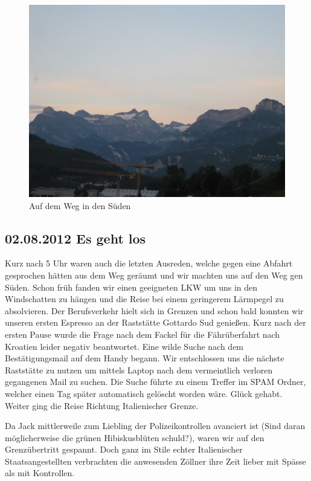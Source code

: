 \begin{figure}[hbt]
    \centering
    \includegraphics[width=\textwidth]{../Bilder/Sommer2012/1.jpg}
    \caption{Auf dem Weg in den Süden}
    \label{img:Sommer1}
\end{figure}

\subsection{02.08.2012 Es geht los}
Kurz nach 5 Uhr waren auch die letzten Ausreden, welche gegen eine Abfahrt gesprochen hätten aus dem Weg geräumt und wir machten uns auf den Weg gen Süden.
Schon früh fanden wir einen geeigneten LKW um uns in den Windschatten zu hängen und die Reise bei einem geringerem Lärmpegel zu absolvieren.
Der Berufsverkehr hielt sich in Grenzen und schon bald konnten wir unseren ersten Espresso an der Raststätte Gottardo Sud genießen.
Kurz nach der ersten Pause wurde die Frage nach dem Fackel für die Fährüberfahrt nach Kroatien leider negativ beantwortet.
Eine wilde Suche nach dem Bestätigungsmail auf dem Handy begann.
Wir entschlossen uns die nächste Raststätte zu nutzen um mittels Laptop nach dem vermeintlich verloren gegangenen Mail zu suchen.
Die Suche führte zu einem Treffer im SPAM Ordner, welcher einen Tag später automatisch gelöscht worden wäre.
Glück gehabt. Weiter ging die Reise Richtung Italienischer Grenze.

Da Jack mittlerweile zum Liebling der Polizeikontrollen avanciert ist (Sind daran möglicherweise die grünen Hibiskusblüten schuld?), waren wir auf den Grenzübertritt gespannt.
Doch ganz im Stile echter Italienischer Staatsangestellten verbrachten die anwesenden Zöllner ihre Zeit lieber mit Spässe als mit Kontrollen.

